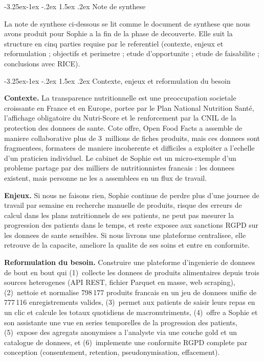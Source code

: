 \documentclass[a4paper,11pt,oneside,openany]{report}
\makeatletter
\renewcommand\subsection{\@startsection{subsection}{2}{\z@}%
  {-3.25ex\@plus -1ex \@minus -.2ex}%
  {1.5ex \@plus .2ex}%
  {\normalfont\large\bfseries\color{ntdarkgreen}}}
\renewcommand\subsubsection{\@startsection{subsubsection}{3}{\z@}%
  {-3.25ex\@plus -1ex \@minus -.2ex}%
  {1.5ex \@plus .2ex}%
  {\normalfont\normalsize\bfseries\color{ntblue}}}
\newcommand{\off}{Open Food Facts}
\newcommand{\rgpd}{RGPD}
\makeatother
\begin{document}
\subsection{Note de synthese}

La note de synthese ci-dessous se lit comme le document de synthese
que nous avons produit pour Sophie a la fin de la phase de decouverte.
Elle suit la structure en cinq parties requise par le referentiel
(contexte, enjeux et reformulation ; objectifs et perimetre ; etude
d'opportunite ; etude de faisabilite ; conclusions avec RICE).

\subsubsection{Contexte, enjeux et reformulation du besoin}

\textbf{Contexte.} La transparence nutritionnelle est une
preoccupation societale croissante en France et en Europe, portee par
le Plan National Nutrition Sant\'{e}, l'affichage obligatoire du
Nutri-Score et le renforcement par la CNIL de la protection des
donnees de sante. Cote offre, \off{} a assemble de maniere
collaborative plus de 3~millions de fiches produits, mais ces donnees
sont fragmentees, formatees de maniere incoherente et difficiles a
exploiter a l'echelle d'un praticien individuel. Le cabinet de Sophie
est un micro-exemple d'un probleme partage par des milliers de
nutritionnistes francais : les donnees existent, mais personne ne les
a assemblees en un flux de travail.

\textbf{Enjeux.} Si nous ne faisons rien, Sophie continue de perdre
plus d'une journee de travail par semaine en recherche manuelle de
produits, risque des erreurs de calcul dans les plans nutritionnels
de ses patients, ne peut pas mesurer la progression des patients dans
le temps, et reste exposee aux sanctions \rgpd{} sur les donnees de
sante sensibles. Si nous livrons une plateforme centralisee, elle
retrouve de la capacite, ameliore la qualite de ses soins et entre en
conformite.

\textbf{Reformulation du besoin.} Construire une plateforme
d'ingenierie de donnees de bout en bout qui (1)~collecte les donnees
de produits alimentaires depuis trois sources heterogenes (API REST,
fichier Parquet en masse, web scraping), (2)~nettoie et normalise
798\,177 produits francais en un jeu de donnees unifie de 777\,116
enregistrements valides, (3)~permet aux patients de saisir leurs
repas en un clic et calcule les totaux quotidiens de macronutriments,
(4)~offre a Sophie et son assistante une vue en series temporelles de
la progression des patients, (5)~expose des agregats anonymises a
l'analyste via une couche gold et un catalogue de donnees, et
(6)~implemente une conformite \rgpd{} complete par conception
(consentement, retention, pseudonymisation, effacement).
\end{document}
